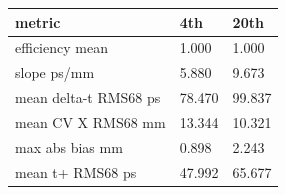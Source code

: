 \begin{tabular}{lll}
metric & 4th & 20th \\
\hline
efficiency mean & 1.000 & 1.000 \\
slope ps/mm & 5.880 & 9.673 \\
mean delta-t RMS68 ps & 78.470 & 99.837 \\
mean CV X RMS68 mm & 13.344 & 10.321 \\
max abs bias mm & 0.898 & 2.243 \\
mean t+ RMS68 ps & 47.992 & 65.677 \\
\end{tabular}
